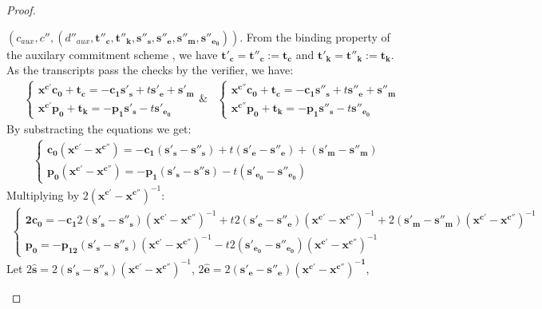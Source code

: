 \begin{proof}
\begin{description}
    $(c_{aux}, c'', (d''_{aux}, \mathbf{t''_c, t''_k, s''_s, s''_e,
      s''_m, s''_{e_0}}))$. From the binding property of the auxilary
    commitment scheme \cite{pedersen1991non}, we have $\mathbf{t'_c = t''_c := t_c}$
    and $\mathbf{t'_k = t''_k := t_k}$. As the transcripts pass the
    checks by the verifier, we have:
    \begin{align*}
      &\begin{cases}
        \mathbf{x^{c'}c_0 + t_c} = -\mathbf{c_1s'_{s}} +
        t\mathbf{s'_{e}+ s'_{m}}
        \\
        \mathbf{x^{c'}p_0} + \mathbf{t_k} = -\mathbf{p_1s'_s}
        -t\mathbf{s'_{e_0}}
      \end{cases} \&
      &\begin{cases}
        \mathbf{x^{c''}c_0 + t_c} = -\mathbf{c_1s''_{s}} +
        t\mathbf{s''_{e}+ s''_{m}}
        \\
        \mathbf{x^{c''}p_0} + \mathbf{t_k} = -\mathbf{p_1s''_s}
        -t\mathbf{s''_{e_0}}
      \end{cases}
    \end{align*}
    By substracting the equations we get:
    \begin{align*}
      \begin{cases}
        \mathbf{c_0(x^{c'} - x^{c''})} = -\mathbf{c_1}(\mathbf{s'_s
          - s''_s}) + t\mathbf{(s'_e - s''_e)} +(\mathbf{s'_m -
          s''_m})\\
        \mathbf{p_0(x^{c'} - x^{c''})} = -\mathbf{p_1(s'_s - s''s)}
        - t\mathbf{(s'_{e_0} - s''_{e_0})}
      \end{cases}
    \end{align*}
    Multiplying by $2(\mathbf{x^{c'} - x^{c''}})^{-1}$:
    \begin{align*}
      \begin{cases}
        \mathbf{2c_0} = -\mathbf{c_1}2(\mathbf{s'_s
          - s''_s})(\mathbf{x^{c'} - x^{c''}})^{-1} + t2\mathbf{(s'_e -
          s''_e)}(\mathbf{x^{c'} - x^{c''}})^{-1} +2(\mathbf{s'_m -
          s''_m})(\mathbf{x^{c'} - x^{c''}})^{-1}\\
        \mathbf{p_0} = -\mathbf{p_12(s'_s - s''_s)}(\mathbf{x^{c'} - x^{c''}})^{-1}
        - t2\mathbf{(s'_{e_0} - s''_{e_0})}(\mathbf{x^{c'} - x^{c''}})^{-1}
      \end{cases}
    \end{align*}
    Let $2\hat{\mathbf{s}} = 2(\mathbf{s'_s -
      s''_s})(\mathbf{x^{c'}-x^{c''}})^{-1} $, $2\hat{\mathbf{e}} =
    2\mathbf{(s'_e - s''_e)(x^{c'} - x^{c''})^{-1}}$,

\end{description}
\end{proof}
